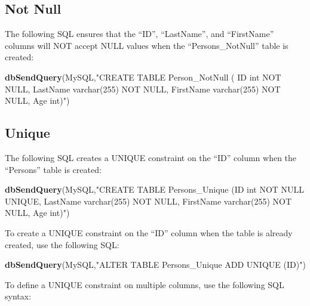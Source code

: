 \documentclass[
]{book}
\newenvironment{Shaded}{\begin{snugshade}}{\end{snugshade}}
\newcommand{\FunctionTok}[1]{\textcolor[rgb]{0.13,0.29,0.53}{\textbf{#1}}}
\newcommand{\NormalTok}[1]{#1}
\newcommand{\StringTok}[1]{\textcolor[rgb]{0.31,0.60,0.02}{#1}}
\begin{document}
\hypertarget{not-null}{%
\subsection{Not Null}\label{not-null}}

The following SQL ensures that the ``ID'', ``LastName'', and ``FirstName'' columns will NOT accept NULL values when the ``Persons\_NotNull'' table is created:

\begin{Shaded}
\begin{Highlighting}[]
\FunctionTok{dbSendQuery}\NormalTok{(MySQL,}\StringTok{"CREATE TABLE Person\_NotNull (}
\StringTok{                   ID int NOT NULL,}
\StringTok{                   LastName varchar(255) NOT NULL,}
\StringTok{                   FirstName varchar(255) NOT NULL,}
\StringTok{                   Age int)"}\NormalTok{)}
\end{Highlighting}
\end{Shaded}

\hypertarget{unique}{%
\subsection{Unique}\label{unique}}

The following SQL creates a UNIQUE constraint on the ``ID'' column when the ``Persons'' table is created:

\begin{Shaded}
\begin{Highlighting}[]
\FunctionTok{dbSendQuery}\NormalTok{(MySQL,}\StringTok{"CREATE TABLE Persons\_Unique (ID int NOT NULL UNIQUE,}
\StringTok{                   LastName varchar(255) NOT NULL,}
\StringTok{                   FirstName varchar(255) NOT NULL,}
\StringTok{                   Age int)"}\NormalTok{)}
\end{Highlighting}
\end{Shaded}

To create a UNIQUE constraint on the ``ID'' column when the table is already created, use the following SQL:

\begin{Shaded}
\begin{Highlighting}[]
\FunctionTok{dbSendQuery}\NormalTok{(MySQL,}\StringTok{"ALTER TABLE Persons\_Unique}
\StringTok{                   ADD UNIQUE (ID)"}\NormalTok{)}
\end{Highlighting}
\end{Shaded}

To define a UNIQUE constraint on multiple columns, use the following SQL syntax:
\end{document}
